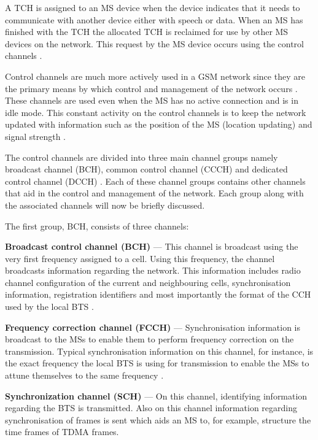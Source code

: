 A TCH is assigned to an MS device when the device indicates that it needs to communicate with another device either with speech or data. When an MS has finished with the TCH the allocated TCH is reclaimed for use by other MS devices on the network. This request by the MS device occurs using the control channels \cite{GSMArchitectureProtocolsServices}.

Control channels are much more actively used in a GSM network since they are the primary means by which control and management of the network occurs \cite{GSMArchitectureProtocolsServices}. These channels are used even when the MS has no active connection and is in idle mode. This constant activity on the control channels is to keep the network updated with information such as the position of the MS (location updating) and signal strength \cite{GSMArchitectureProtocolsServices,GSMSysEngin,Eisenblatter}. 

The control channels are divided into three main channel groups namely broadcast channel (BCH), common control channel (CCCH) and dedicated control channel (DCCH) \cite{GSMArchitectureProtocolsServices}. Each of these channel groups contains other channels that aid in the control and management of the network. Each group along with the associated channels will now be briefly discussed.

The first group, BCH, consists of three channels:
\begin{description}
\item{\textbf{Broadcast control channel (BCH)}} --- This channel is broadcast using the very first frequency assigned to a cell. Using this frequency, the channel broadcasts information regarding the network. This information includes radio channel configuration of the current and neighbouring cells, synchronisation information, registration identifiers and most importantly the format of the CCH used by the local BTS \cite{GSMArchitectureProtocolsServices}.
\item{\textbf{Frequency correction channel (FCCH)}} --- Synchronisation information is broadcast to the MSs to enable them to perform frequency correction on the transmission. Typical synchronisation information on this channel, for instance, is the exact frequency the local BTS is using for transmission to enable the MSs to attune themselves to the same frequency \cite{GSMArchitectureProtocolsServices}.
\item{\textbf{Synchronization channel (SCH)}} --- On this channel, identifying information regarding the BTS is transmitted. Also on this channel information regarding synchronisation of frames is sent which aids an MS to, for example, structure the time frames of TDMA frames.
\end{description}

